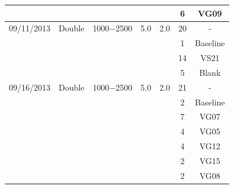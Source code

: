 \documentclass[osajnl,preprint,showpacs,superscriptaddress,12pt]{revtex4-1} %
\begin{document}
\begin{table}[h!]
\begin{center}
\begin{tabular}{c c c c c c c}
	                   &            &                       &       &         &    6 &  VG09\\
    \hline
    	09/11/2013 & Double & 1000$-$2500 & 5.0 & 2.0  &  20 &   -  \\	                   
	                   &            &                       &       &         &    1 &  Baseline\\
	                   &            &                       &       &         &    14 &  VS21\\	                   
	                   &            &                       &       &         &    5 &  Blank\\ %
    \hline
    	09/16/2013 & Double & 1000$-$2500 & 5.0 & 2.0  &  21 &   -  \\
	                   &            &                       &       &         &    2 &  Baseline\\
	                   &            &                       &       &         &    7 &  VG07\\	                   
	                   &            &                       &       &         &    4 &  VG05\\	
	                   &            &                       &       &         &    4 &  VG12\\
	                   &            &                       &       &         &    2 &  VG15\\	                   
	                   &            &                       &       &         &    2 &  VG08\\
    \hline
    \end{tabular}
\end{center}
\end{table}
\end{document}
